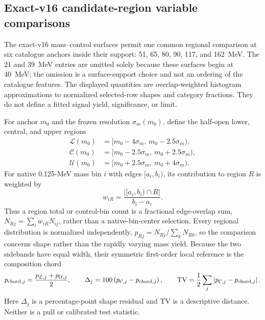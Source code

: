 \subsection{Exact-v16 candidate-region variable comparisons}
\label{app:v4p3-candidate-region-comparisons}

The exact-v16 mass--control surfaces permit one common regional comparison at
six catalogue anchors inside their support: 51, 65, 80, 90, 117, and
162~MeV.  The 21 and 39~MeV entries are omitted solely because these surfaces
begin at 40~MeV; the omission is a surface-support choice and not an ordering
of the catalogue features.  The displayed quantities are overlap-weighted
histogram approximations to normalized selected-row shapes and category
fractions.  They do not define a fitted signal yield, significance, or limit.

For anchor $m_0$ and the frozen resolution $\sigma_m(m_0)$, define the
half-open lower, central, and upper regions
\begin{equation}
\begin{aligned}
 \mathcal{L}(m_0) &=[m_0-4\sigma_m,\,m_0-2.5\sigma_m), \\
 \mathcal{C}(m_0) &=[m_0-2.5\sigma_m,\,m_0+2.5\sigma_m), \\
 \mathcal{U}(m_0) &=[m_0+2.5\sigma_m,\,m_0+4\sigma_m).
\end{aligned}
\label{eq:v4p3-candidate-region-windows}
\end{equation}
For native 0.125-MeV mass bin $i$ with edges $[a_i,b_i)$, its contribution
to region $R$ is weighted by
\begin{equation}
 w_{iR}=\frac{\left|[a_i,b_i)\cap R\right|}{b_i-a_i}.
 \label{eq:v4p3-region-overlap-weight}
\end{equation}
Thus a region total or control-bin count is a fractional edge-overlap sum,
$N_{Rj}=\sum_i w_{iR}N_{ij}$, rather than a native-bin-center selection.
Every regional distribution is normalized independently,
$p_{Rj}=N_{Rj}/\sum_kN_{Rk}$, so the comparison concerns shape rather than
the rapidly varying mass yield.  Because the two sidebands have equal width,
their symmetric first-order local reference is the composition chord
\begin{equation}
 p_{{\rm chord},j}=\frac{p_{\mathcal{L},j}+p_{\mathcal{U},j}}{2},\qquad
 \Delta_j=100\left(p_{\mathcal{C},j}-p_{{\rm chord},j}\right),\qquad
 \mathrm{TV}=\frac{1}{2}\sum_j
 \left|p_{\mathcal{C},j}-p_{{\rm chord},j}\right|.
 \label{eq:v4p3-region-comparison-statistics}
\end{equation}
Here $\Delta_j$ is a percentage-point shape residual and TV is a descriptive
distance.  Neither is a pull or calibrated test statistic.

